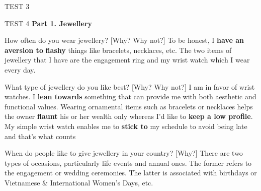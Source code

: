 \begin{glossarymc}[Cambridge 15]
\begin{test}{TEST 3}
\begin{VocabHighlights}
    \end{VocabHighlights}
    \end{test}

    \begin{test}{TEST 4}
    \noindent
    \textbf{Part 1. Jewellery}
    \begin{qa}{How often do you wear jewellery? [Why? Why not?]}
    To be honest, I \textbf{have an aversion to} \textbf{flashy} things like bracelets, necklaces, etc. The two items of jewellery that I have are the engagement ring and my wrist watch which I wear every day.
    \end{qa}

    \begin{qa}{What type of jewellery do you like best? [Why? Why not?]}
    I am in favor of wrist watches. I \textbf{lean towards} something that can provide me with both aesthetic and functional values. Wearing ornamental items such as bracelets or necklaces helps the owner \textbf{flaunt} his or her wealth only whereas I’d like to \textbf{keep a low profile}. My simple wrist watch enables me to \textbf{stick to} my schedule to avoid being late and that’s what counts
    \end{qa}

    \begin{qa}{When do people like to give jewellery in your country? [Why?]}
    There are two types of occasions, particularly life events and annual ones. The former refers to the engagement or wedding ceremonies. The latter is associated with birthdays or Vietnamese \& International Women’s Days, etc.
    \end{qa}


\end{test}
\end{glossarymc}
